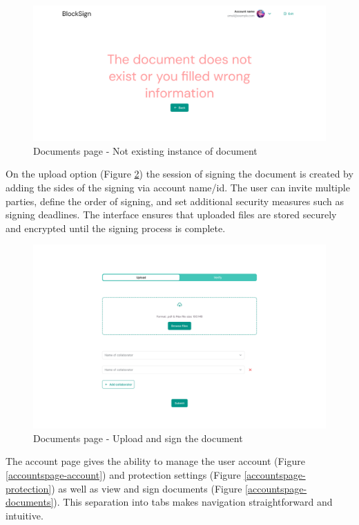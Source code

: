 \begin{figure}[H]
    \centering
    \includegraphics[width=18cm]{"images/figmaUI/unsuccess-crop.png"}
    \caption{Documents page - Not existing instance of document}
    \label{documents-noinstance}
\end{figure}

On the upload option (Figure \ref{documentspage2}) the session of signing the document is created by adding the sides of the signing via account name/id. 
The user can invite multiple parties, define the order of signing, and set additional security measures such as signing deadlines. 
The interface ensures that uploaded files are stored securely and encrypted until the signing process is complete.

\begin{figure}[H]
    \centering
    \includegraphics[width=18cm]{"images/figmaUI/documentspage2-crop.png"}
    \caption{Documents page - Upload and sign the document}
    \label{documentspage2}
\end{figure}

\newpage
The account page gives the ability to manage the user account (Figure \ref{accountspage-account}) and protection settings (Figure \ref{accountspage-protection}) as well as view and sign documents (Figure \ref{accountspage-documents}). 
This separation into tabs makes navigation straightforward and intuitive. 

